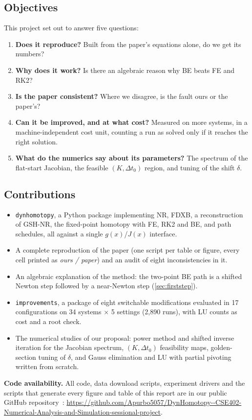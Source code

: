\documentclass[sigconf,nonacm]{acmart}
\newcommand{\code}[1]{\texttt{#1}}
\newcommand{\repo}{\url{https://github.com/Apurbo5057/DynHomotopy--CSE402-Numerical-Analysis-and-Simulation-sessional-project}}
\begin{document}
\subsection{Objectives}
This project set out to answer five questions:
\begin{enumerate}
  \item[\textbf{Q1.}] \textbf{Does it reproduce?} Built from the paper's equations alone, do we get its numbers?
  \item[\textbf{Q2.}] \textbf{Why does it work?} Is there an algebraic reason why BE beats FE and RK2?
  \item[\textbf{Q3.}] \textbf{Is the paper consistent?} Where we disagree, is the fault ours or the paper's?
  \item[\textbf{Q4.}] \textbf{Can it be improved, and at what cost?} Measured on more systems, in a
        machine-independent cost unit, counting a run as solved only if it reaches the right solution.
  \item[\textbf{Q5.}] \textbf{What do the numerics say about its parameters?} The spectrum of the
        flat-start Jacobian, the feasible $(K,\Delta t_0)$ region, and tuning of the shift $\delta$.
\end{enumerate}

\subsection{Contributions}
\begin{itemize}
  \item \code{dynhomotopy}, a Python package implementing NR, FDXB, a reconstruction of GSH-NR, the
        fixed-point homotopy with FE, RK2 and BE, and path schedules, all against a single
        $g(x)$/$J(x)$ interface.
  \item A complete reproduction of the paper (one script per table or figure, every cell printed as
        \emph{ours / paper}) and an audit of eight inconsistencies in it.
  \item An algebraic explanation of the method: the two-point BE path is a shifted Newton step followed by
        a near-Newton step (\cref{sec:firststep}).
  \item \code{improvements}, a package of eight switchable modifications evaluated in 17 configurations on
        34 systems $\times$ 5 settings (2{,}890 runs), with LU counts as cost and a root check.
  \item The numerical studies of our proposal: power method and shifted inverse iteration for the
        Jacobian spectrum, $(K,\Delta t_0)$ feasibility maps, golden-section tuning of $\delta$, and Gauss
        elimination and LU with partial pivoting written from scratch.
\end{itemize}
\noindent\textbf{Code availability.} All code, data download scripts, experiment drivers and the scripts
that generate every figure and table of this report are in our public GitHub
repository~\cite{ourrepo}: \repo.
\end{document}
